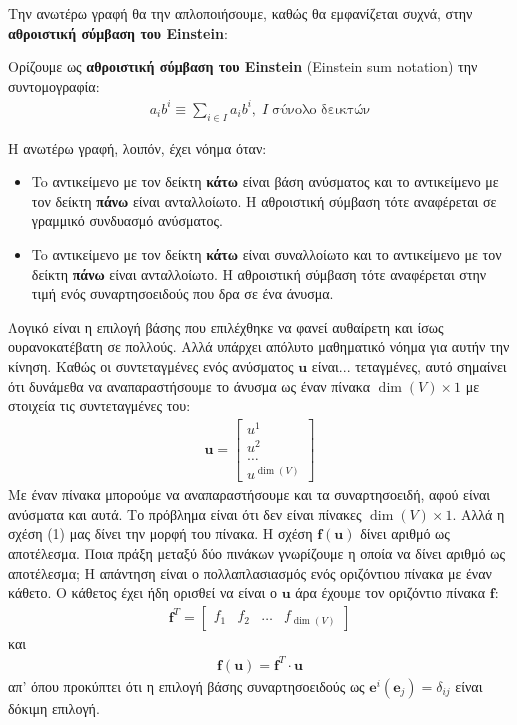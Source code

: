 \documentclass[main.tex]{subfiles}
\begin{document}
	Την ανωτέρω γραφή θα την απλοποιήσουμε, καθώς θα εμφανίζεται συχνά, στην \textbf{αθροιστική σύμβαση του Einstein}:
	\begin{definition}
		Ορίζουμε ως \textbf{αθροιστική σύμβαση του Einstein} (Einstein sum notation) την συντομογραφία:
		\begin{align*}
			a_ib^i \equiv \sum_{i\in I}a_ib^i,\; I\;\text{σύνολο δεικτών}
		\end{align*}
	\end{definition}
	Η ανωτέρω γραφή, λοιπόν, έχει νόημα όταν:
	\begin{itemize}
		\item To αντικείμενο με τον δείκτη \textbf{κάτω} είναι βάση ανύσματος και το αντικείμενο με τον δείκτη \textbf{πάνω} είναι ανταλλοίωτο. Η αθροιστική σύμβαση τότε αναφέρεται σε γραμμικό συνδυασμό ανύσματος.
		\item To αντικείμενο με τον δείκτη \textbf{κάτω} είναι συναλλοίωτο και το αντικείμενο με τον δείκτη \textbf{πάνω} είναι ανταλλοίωτο. Η αθροιστική σύμβαση τότε αναφέρεται στην τιμή ενός συναρτησοειδούς που δρα σε ένα άνυσμα.
	\end{itemize}

	Λογικό είναι η επιλογή βάσης που επιλέχθηκε να φανεί αυθαίρετη και ίσως ουρανοκατέβατη σε πολλούς. Αλλά υπάρχει απόλυτο μαθηματικό νόημα για αυτήν την κίνηση. Καθώς οι συντεταγμένες ενός ανύσματος $\boldsymbol{u}$ είναι... τεταγμένες, αυτό σημαίνει ότι δυνάμεθα να αναπαραστήσουμε το άνυσμα ως έναν πίνακα $\dim(V)\times 1$ με στοιχεία τις συντεταγμένες του:
	\begin{align*}
		\boldsymbol{u} = \begin{bmatrix}
			u^1 \\
			u^2 \\
			\ldots \\
			u^{\dim(V)}
		\end{bmatrix}
	\end{align*}
	Με έναν πίνακα μπορούμε να αναπαραστήσουμε και τα συναρτησοειδή, αφού είναι ανύσματα και αυτά. Το πρόβλημα είναι ότι δεν είναι πίνακες ${\dim(V)\times 1}$. Αλλά η σχέση (1) μας δίνει την μορφή του πίνακα. Η σχέση $\boldsymbol{f}(\boldsymbol{u})$ δίνει αριθμό ως αποτέλεσμα. Ποια πράξη μεταξύ δύο πινάκων γνωρίζουμε η οποία να δίνει αριθμό ως αποτέλεσμα; Η απάντηση είναι ο πολλαπλασιασμός ενός οριζόντιου πίνακα με έναν κάθετο. Ο κάθετος έχει ήδη ορισθεί να είναι ο $\boldsymbol{u}$ άρα έχουμε τον οριζόντιο πίνακα $\boldsymbol{f}$:
	\begin{align*}
		\boldsymbol{f}^T = \begin{bmatrix}
			f_1 & f_2 & \ldots & f_{\dim(V)}
		\end{bmatrix}
	\end{align*}
	και
	\begin{align*}
		\boldsymbol{f}(\boldsymbol{u}) = \boldsymbol{f}^T\cdot\boldsymbol{u} 
	\end{align*}
	απ' όπου προκύπτει ότι η επιλογή βάσης συναρτησοειδούς ως $\boldsymbol{e}^i(\boldsymbol{e}_j) = \delta_{ij}$ είναι δόκιμη επιλογή.
	
\end{document}
